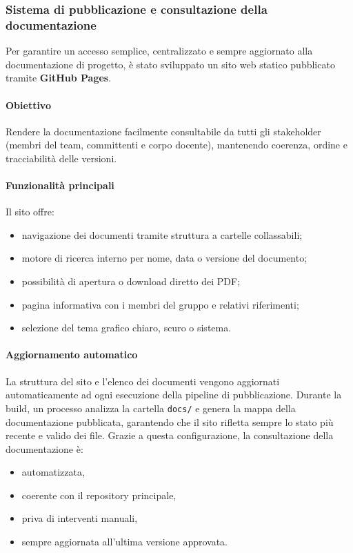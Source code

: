 \documentclass[a4paper, 11pt, oneside]{scrartcl} %
\begin{document}
\subsubsection{Sistema di pubblicazione e consultazione della documentazione}
Per garantire un accesso semplice, centralizzato e sempre aggiornato alla documentazione di progetto, è stato sviluppato un sito web statico pubblicato tramite \textbf{GitHub Pages}{\scriptsize{}}.
\paragraph{Obiettivo}
Rendere la documentazione facilmente consultabile da tutti gli stakeholder{\scriptsize{}} (membri del team, committenti e corpo docente), mantenendo coerenza, ordine e tracciabilità delle versioni.
\paragraph{Funzionalità principali}
Il sito offre:

\begin{itemize}
    \item navigazione dei documenti tramite struttura a cartelle collassabili;
\item motore di ricerca interno per nome, data o versione del documento;
\item possibilità di apertura o download diretto dei PDF;
    \item pagina informativa con i membri del gruppo e relativi riferimenti;
\item selezione del tema grafico chiaro, scuro o sistema.
\end{itemize}

\paragraph{Aggiornamento automatico}
La struttura del sito e l’elenco dei documenti vengono aggiornati automaticamente ad ogni esecuzione della pipeline{\scriptsize{}} di pubblicazione.
Durante la build{\scriptsize{}}, un processo analizza la cartella \texttt{docs/} e genera la mappa della documentazione pubblicata, garantendo che il sito rifletta sempre lo stato più recente e valido dei file.
Grazie a questa configurazione, la consultazione della documentazione è:
\begin{itemize}
    \item automatizzata,
    \item coerente con il repository principale,
    \item priva di interventi manuali,
    \item sempre aggiornata all’ultima versione approvata.
\end{itemize}
\end{document}

